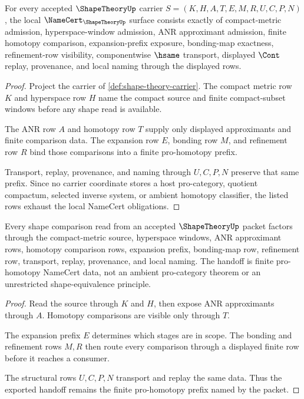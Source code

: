 \begin{theorem}
\label{thm:shape-theory-namecert-obligations}
For every accepted $\ShapeTheoryUp$ carrier $S=(K,H,A,T,E,M,R,U,C,P,N)$, the local $\NameCert_{\ShapeTheoryUp}$ surface consists exactly of compact-metric admission, hyperspace-window admission, ANR approximant admission, finite homotopy comparison, expansion-prefix exposure, bonding-map exactness, refinement-row visibility, componentwise $\hsame$ transport, displayed $\Cont$ replay, provenance, and local naming through the displayed rows.
\end{theorem}
\begin{proof}
Project the carrier of \autoref{def:shape-theory-carrier}. The compact metric row $K$ and hyperspace row $H$ name the compact source and finite compact-subset windows before any shape read is available.

The ANR row $A$ and homotopy row $T$ supply only displayed approximants and finite comparison data. The expansion row $E$, bonding row $M$, and refinement row $R$ bind those comparisons into a finite pro-homotopy prefix.

Transport, replay, provenance, and naming through $U,C,P,N$ preserve that same prefix. Since no carrier coordinate stores a host pro-category, quotient compactum, selected inverse system, or ambient homotopy classifier, the listed rows exhaust the local NameCert obligations.
\end{proof}

\begin{theorem}
\label{thm:shape-theory-pro-homotopy-handoff}
Every shape comparison read from an accepted $\ShapeTheoryUp$ packet factors through the compact-metric source, hyperspace windows, ANR approximant rows, homotopy comparison rows, expansion prefix, bonding-map row, refinement row, transport, replay, provenance, and local naming. The handoff is finite pro-homotopy NameCert data, not an ambient pro-category theorem or an unrestricted shape-equivalence principle.
\end{theorem}
\begin{proof}
Read the source through $K$ and $H$, then expose ANR approximants through $A$. Homotopy comparisons are visible only through $T$.

The expansion prefix $E$ determines which stages are in scope. The bonding and refinement rows $M,R$ then route every comparison through a displayed finite row before it reaches a consumer.

The structural rows $U,C,P,N$ transport and replay the same data. Thus the exported handoff remains the finite pro-homotopy prefix named by the packet.
\end{proof}


